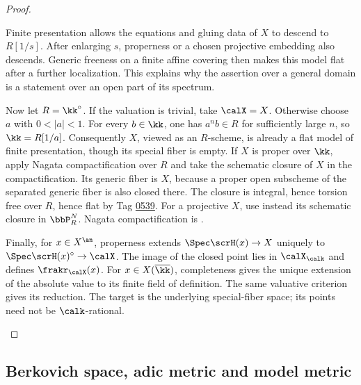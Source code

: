 \begin{proof}
	\Yang{}
	\begin{latexmathchange}
	Finite presentation allows the equations and gluing data of $X$ to descend to $R[1/s]$.
	After enlarging $s$, properness or a chosen projective embedding also descends.
	Generic freeness on a finite affine covering then makes this model flat after a further localization.
	This explains why the assertion over a general domain is a statement over an open part of its spectrum.

	Now let $R = \kk^\circ$.
	If the valuation is trivial, take $\calX = X$.
	Otherwise choose $a$ with $0 < |a| < 1$.
	For every $b \in \kk$, one has $a^n b \in R$ for sufficiently large $n$, so $\kk = R[1/a]$.
	Consequently $X$, viewed as an $R$-scheme, is already a flat model of finite presentation, though its special fiber is empty.
	If $X$ is proper over $\kk$, apply Nagata compactification over $R$ and take the schematic closure of $X$ in the compactification.
	Its generic fiber is $X$, because a proper open subscheme of the separated generic fiber is also closed there.
	The closure is integral, hence torsion free over $R$, hence flat by Tag \href{https://stacks.math.columbia.edu/tag/0539}{0539}.
	For a projective $X$, use instead its schematic closure in $\bbP^N_R$.
	Nagata compactification is \cite[Tag \href{https://stacks.math.columbia.edu/tag/0F41}{0F41}]{Stacksprojectauthors-2026-StacksProject}.

	Finally, for $x \in X^\an$, properness extends $\Spec\scrH(x) \to X$ uniquely to $\Spec\scrH(x)^\circ \to \calX$.
	The image of the closed point lies in $\calX_\calk$ and defines $\frakr_\calX(x)$.
	For $x \in X(\overline{\kk})$, completeness gives the unique extension of the absolute value to its finite field of definition.
	The same valuative criterion gives its reduction.
	The target is the underlying special-fiber space; its points need not be $\calk$-rational.
	\end{latexmathchange}
\end{proof}















\subsection[status=draft,tag=0000000,label=\labelNFM{subsec:adic-metric-and-model-metric}]{Berkovich space, adic metric and model metric}


